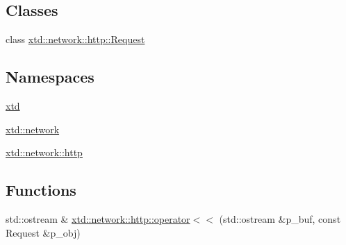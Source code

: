 \subsection*{Classes}
\begin{DoxyCompactItemize}
\item 
class \hyperlink{classxtd_1_1network_1_1http_1_1Request}{xtd\+::network\+::http\+::\+Request}
\end{DoxyCompactItemize}
\subsection*{Namespaces}
\begin{DoxyCompactItemize}
\item 
 \hyperlink{namespacextd}{xtd}
\item 
 \hyperlink{namespacextd_1_1network}{xtd\+::network}
\item 
 \hyperlink{namespacextd_1_1network_1_1http}{xtd\+::network\+::http}
\end{DoxyCompactItemize}
\subsection*{Functions}
\begin{DoxyCompactItemize}
\item 
std\+::ostream \& \hyperlink{namespacextd_1_1network_1_1http_a48e500be5ba75ae2ce3d8bdb549f9211}{xtd\+::network\+::http\+::operator$<$$<$} (std\+::ostream \&p\+\_\+buf, const Request \&p\+\_\+obj)
\end{DoxyCompactItemize}
